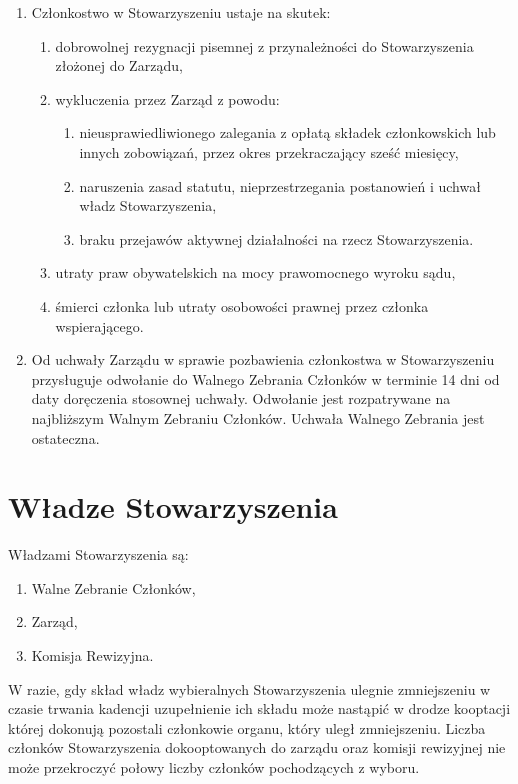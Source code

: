 \documentclass{article}
\begin{document}
\begin{enumerate}
\item
  Członkostwo w Stowarzyszeniu ustaje na skutek:
  \begin{enumerate}
  \def\labelenumii{\alph{enumii}.}
  \item
    dobrowolnej rezygnacji pisemnej z przynależności do Stowarzyszenia złożonej do Zarządu,
  \item
    wykluczenia przez Zarząd z powodu:
    \begin{enumerate}
    \def\labelenumiii{\roman{enumiii}.}
    \item
      nieusprawiedliwionego zalegania z opłatą składek członkowskich lub innych zobowiązań, przez okres przekraczający sześć miesięcy,
    \item
      naruszenia zasad statutu, nieprzestrzegania postanowień i uchwał władz Stowarzyszenia,
    \item
      braku przejawów aktywnej działalności na rzecz Stowarzyszenia.
    \end{enumerate}
  \item
    utraty praw obywatelskich na mocy prawomocnego wyroku sądu,
  \item
    śmierci członka lub utraty osobowości prawnej przez członka
    wspierającego.
  \end{enumerate}
\item
  Od uchwały Zarządu w sprawie pozbawienia członkostwa w Stowarzyszeniu przysługuje odwołanie do Walnego Zebrania Członków w terminie 14 dni od daty doręczenia stosownej uchwały. Odwołanie jest rozpatrywane na najbliższym Walnym Zebraniu Członków. Uchwała Walnego Zebrania jest ostateczna.
\end{enumerate}

\section{Władze Stowarzyszenia}
Władzami Stowarzyszenia są:
\begin{enumerate}
\item
  Walne Zebranie Członków,
\item
  Zarząd,
\item
  Komisja Rewizyjna.
\end{enumerate}

W razie, gdy skład władz wybieralnych Stowarzyszenia ulegnie zmniejszeniu w czasie trwania kadencji uzupełnienie ich składu może nastąpić w drodze kooptacji której dokonują pozostali członkowie organu, który uległ zmniejszeniu. Liczba członków Stowarzyszenia dokooptowanych do zarządu oraz komisji rewizyjnej nie może przekroczyć połowy liczby członków pochodzących z wyboru.
\end{document}
